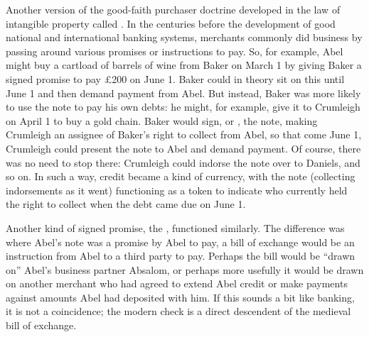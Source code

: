 


Another version of the good-faith purchaser doctrine developed in the law of
intangible property called .
In the centuries before
the development of good national and international banking systems, merchants
commonly did business by passing around various promises or instructions to
pay. So, for example, Abel might buy a cartload of barrels of wine from Baker
on March 1 by giving Baker a signed promise to pay {\pounds}200 on June 1.
Baker could in theory sit on this  until June 1 and
then demand payment from Abel. But instead, Baker was more likely to use the
note to pay his own debts: he might, for example, give it to Crumleigh on April
1 to buy a gold chain. Baker would sign, or , the note, making
Crumleigh an assignee of Baker's right to collect from Abel, so that come June
1, Crumleigh could present the note to Abel and demand payment. Of course,
there was no need to stop there: Crumleigh could indorse the note over to
Daniels, and so on. In such a way, credit became a kind of currency, with the
note (collecting indorsements as it went) functioning as a token to indicate
who currently held the right to collect when the debt came due on June 1.

Another kind of signed promise, the , functioned
similarly. The difference was where Abel's note was a promise by Abel to pay, a
bill of exchange would be an instruction from Abel to a third party to pay.
Perhaps the bill would be ``drawn on'' Abel's business partner Absalom, or
perhaps more usefully it would be drawn on another merchant who had agreed to
extend Abel credit or make payments against amounts Abel had deposited with
him. If this sounds a bit like banking, it is not a coincidence; the modern
check is a direct descendent of the medieval bill of exchange.

